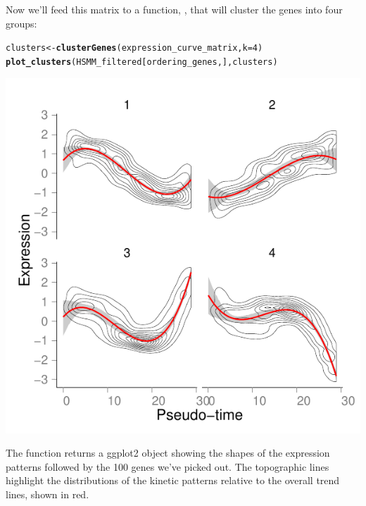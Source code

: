 \documentclass[10pt,oneside]{article}\usepackage[]{graphicx}\usepackage[]{color}
\makeatletter
\def\maxwidth{ %
  \ifdim\Gin@nat@width>\linewidth
    \linewidth
  \else
    \Gin@nat@width
  \fi
}
\newcommand{\hlnum}[1]{\textcolor[rgb]{0.686,0.059,0.569}{#1}}%
\newcommand{\hlstd}[1]{\textcolor[rgb]{0.345,0.345,0.345}{#1}}%
\newcommand{\hlkwb}[1]{\textcolor[rgb]{0.69,0.353,0.396}{#1}}%
\newcommand{\hlkwc}[1]{\textcolor[rgb]{0.333,0.667,0.333}{#1}}%
\newcommand{\hlkwd}[1]{\textcolor[rgb]{0.737,0.353,0.396}{\textbf{#1}}}%
\newenvironment{kframe}{%
 \def\at@end@of@kframe{}%
 \ifinner\ifhmode%
  \def\at@end@of@kframe{\end{minipage}}%
  \begin{minipage}{\columnwidth}%
 \fi\fi%
 \def\FrameCommand##1{\hskip\@totalleftmargin \hskip-\fboxsep
 \colorbox{shadecolor}{##1}\hskip-\fboxsep
     \hskip-\linewidth \hskip-\@totalleftmargin \hskip\columnwidth}%
 \MakeFramed {\advance\hsize-\width
   \@totalleftmargin\z@ \linewidth\hsize
   \@setminipage}}%
 {\par\unskip\endMakeFramed%
 \at@end@of@kframe}
\newenvironment{knitrout}{}{} %
\makeatother
\begin{document}
Now we'll feed this matrix to a function, , that will cluster the genes into four groups:

\begin{knitrout}
\color{fgcolor}\begin{kframe}
\begin{alltt}
\hlstd{clusters} \hlkwb{<-} \hlkwd{clusterGenes}\hlstd{(expression_curve_matrix,} \hlkwc{k} \hlstd{=} \hlnum{4}\hlstd{)}
\hlkwd{plot_clusters}\hlstd{(HSMM_filtered[ordering_genes, ], clusters)}
\end{alltt}
\end{kframe}

{\centering \includegraphics[width=\maxwidth]{figure/cluster_and_plot} 

}



\end{knitrout}


The  function returns a ggplot2 object showing the shapes of the expression patterns followed by the 100 genes we've picked out.  The topographic lines highlight the distributions of the kinetic patterns relative to the overall trend lines, shown in red.

\end{document}
